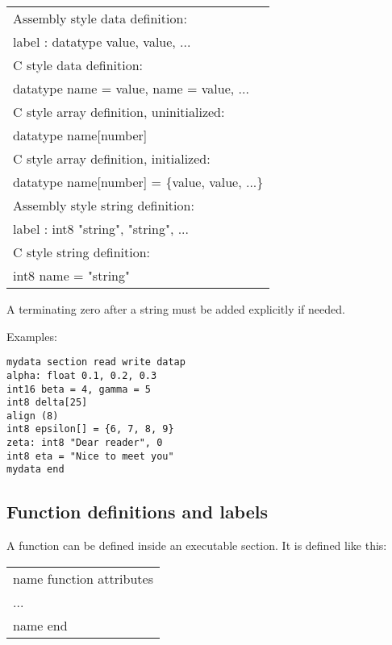 \documentclass[forwardcom.tex]{subfiles}
\begin{document}
\begin{tabular}{|p{140mm}|}
\hline
Assembly style data definition:\\
\hspace{4mm} label : datatype value, value, ...\\
C style data definition:\\
\hspace{4mm} datatype name = value, name = value, ...\\
C style array definition, uninitialized:\\
\hspace{4mm} datatype name[number]\\
C style array definition, initialized:\\
\hspace{4mm} datatype name[number] = \{value, value, ...\}\\
Assembly style string definition:\\
\hspace{4mm} label : int8 "string", "string", ...\\
C style string definition:\\
\hspace{4mm} int8 name = "string" \\
\hline
\end{tabular}
\vspace{2mm}

A terminating zero after a string must be added explicitly if needed.
\vspace{2mm}

Examples:
\vspace{1mm}

\begin{lstlisting}[frame=single, showstringspaces=false]
mydata section read write datap
alpha: float 0.1, 0.2, 0.3
int16 beta = 4, gamma = 5
int8 delta[25]
align (8)
int8 epsilon[] = {6, 7, 8, 9}
zeta: int8 "Dear reader", 0
int8 eta = "Nice to meet you"
mydata end
\end{lstlisting}
\vspace{2mm}


\subsection{Function definitions and labels} \label{assemblyFunctionDef}
A function can be defined inside an executable section. It is defined like this:
\vspace{1mm}

\begin{tabular}{|p{140mm}|}
\hline
\hspace{4mm} name function attributes\\
\hspace{4mm} ...\\
\hspace{4mm} name end\\
\hline
\end{tabular}
\vspace{4mm}
\end{document}
